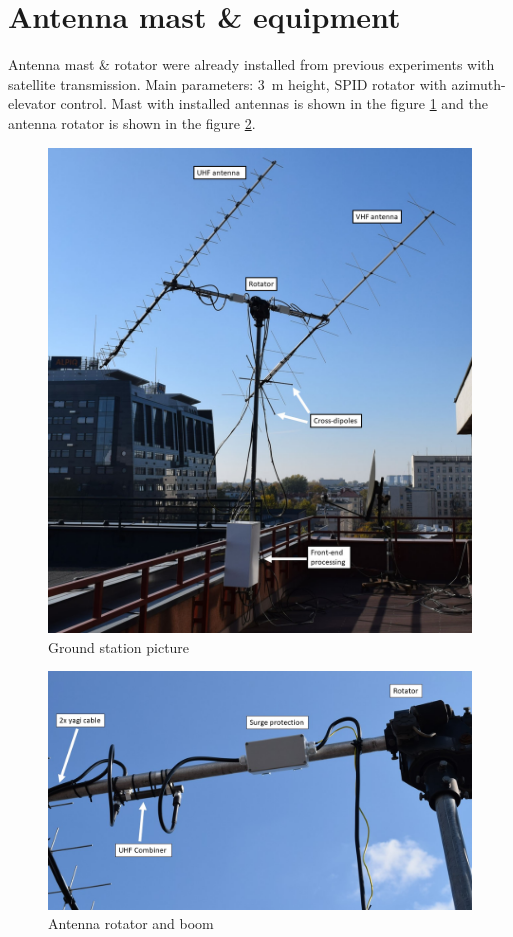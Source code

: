 \section{Antenna mast \& equipment}
Antenna mast \& rotator were already installed from previous experiments with satellite transmission. Main parameters: \SI{3}{\meter} height, SPID rotator with azimuth-elevator control. Mast with installed antennas is shown in the figure \ref{elka_antena_mast} and the antenna rotator is shown in the figure \ref{elka_antenna_rotator}.

\begin{figure}
    \centering
    \includegraphics[width=0.5\paperwidth]{img/5/elka_antena_mast.jpg}
    \caption{Ground station picture}
    \label{elka_antena_mast}
\end{figure}

\begin{figure}
    \centering
    \includegraphics[width=0.75\paperwidth]{img/5/elka_antenna_rotator.jpg}
    \caption{Antenna rotator and boom}
    \label{elka_antenna_rotator}
\end{figure}

